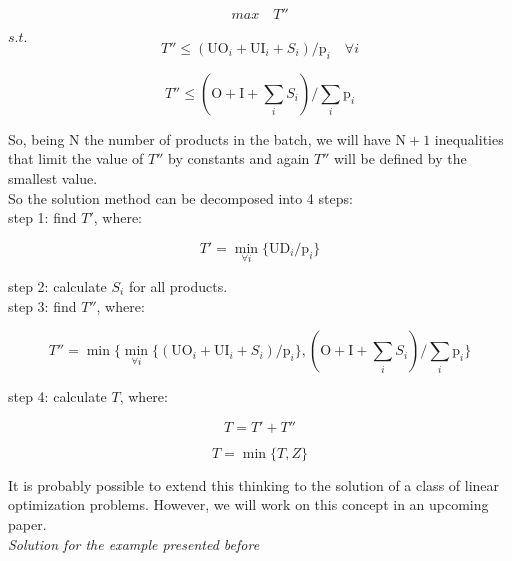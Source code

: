 \documentclass[preprint,12pt,authoryear]{elsarticle}
\begin{document}
\begin{equation}
max \quad T''
\end{equation}

$s.t.$ \\

\begin{equation}
T'' \leq (\textrm{UO}_i + \textrm{UI}_i + S_i) / \textrm{p}_i  \quad \forall i
\end{equation}

\begin{equation}
T'' \leq (\textrm{O} + \textrm{I} + \sum_i {S_i}) / \sum_i {\textrm{p}_i}
\end{equation}

So, being $\textrm{N}$ the number of products in the batch, we will have $\textrm{N}+1$ inequalities that limit the value of $T''$ by constants and again $T''$ will be defined by the smallest value. \\

So the solution method can be decomposed into 4 steps: \\

step 1: find $T'$, where:

\begin{equation}
T' = \min_{\forall i} \{\textrm{UD}_i / \textrm{p}_i\}
\end{equation}

step 2: calculate $S_i$ for all products. \\

step 3: find $T''$, where:

\begin{equation}
T'' = \min \{\min_{\forall i} \{(\textrm{UO}_i + \textrm{UI}_i + S_i) / \textrm{p}_i\},(\textrm{O} + \textrm{I} + \sum_i {S_i}) / \sum_i {\textrm{p}_i}\}
\end{equation}

step 4: calculate $T$, where: 

\begin{equation}
T = T' + T''
\end{equation}

\begin{equation}
T = \min \{T , Z\}
\end{equation}

It is probably possible to extend this thinking to the solution of a class of linear optimization problems. However, we will work on this concept in an upcoming paper. \\

\emph{Solution for the example presented before} \\
\end{document}

